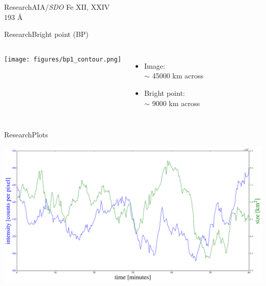 \documentclass[11pt,table]{beamer}
\begin{document}
{%
\begin{frame}[t]{Research}{AIA/\emph{SDO}}
    \hspace{-2em}Fe {\footnotesize XII, XXIV}\\
    \hspace{-2em}193 \AA{}\\
\end{frame}}%
\begin{frame}{Research}{Bright point (BP)}
    \begin{columns}
        \texttt{[image: figures/bp1\_contour.png]}
        \begin{itemize}
            \item Image:\\
                $\sim$ 45000 km across
            \item Bright point:\\
                $\sim$ 9000 km across
        \end{itemize}
    \end{columns}
\end{frame}%
\begin{frame}{Research}{Plots}
    \begin{center}
        \includegraphics[width=0.8\paperwidth]{plot2.png}
    \end{center}
\end{frame}%
\end{document}
